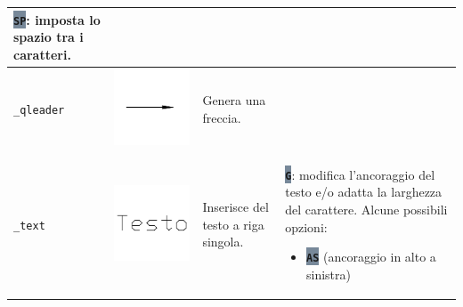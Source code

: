 \documentclass[..]{../IEEEphot}
\newcommand{\param}[1]{\colorbox{LightSlateGray}{\color{Navy}\texttt{\textbf{#1}}}}
\begin{document}
\begin{center}
\begin{longtable}{m{.2\linewidth}m{.2\linewidth}m{.25\linewidth}m{.25\linewidth}}
\param{SP}: imposta lo spazio tra i caratteri.
\\
\midrule
\texttt{\_qleader} & \includegraphics[width = 0.8\linewidth, keepaspectratio]{../images/jpg/_qleader.jpg} & Genera una freccia. \\
\midrule
\texttt{\_text} & \includegraphics[width = 0.8\linewidth, keepaspectratio]{../images/jpg/_text.jpg} & Inserisce del testo a riga singola. & 
\param{G}: modifica l'ancoraggio del testo e/o adatta la larghezza del carattere. Alcune possibili opzioni:
\begin{itemize}
\item \param{AS} (ancoraggio in alto a sinistra)

\end{itemize}
\end{longtable}
\end{center}
\end{document}
